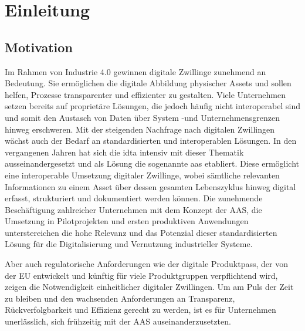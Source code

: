 \section{Einleitung}
\subsection{Motivation}
\label{sec:Motivation}
Im Rahmen von Industrie 4.0 gewinnen digitale Zwillinge zunehmend an Bedeutung. 
Sie ermöglichen die digitale Abbildung physischer Assets und sollen helfen, Prozesse transparenter und effizienter zu gestalten.
Viele Unternehmen setzen bereits auf proprietäre Lösungen, die jedoch häufig nicht interoperabel sind und somit den Austasch von Daten über System -und Unternehmensgrenzen hinweg erschweren.
Mit der steigenden Nachfrage nach digitalen Zwillingen wächst auch der Bedarf an standardisierten und interoperablen Lösungen.
In den vergangenen Jahren hat sich die \ac{idta} intensiv mit dieser Thematik ausseinandergesetzt und als Lösung die sogenannte \ac{aas} etabliert.
Diese ermöglicht eine interoperable Umsetzung digitaler Zwillinge, wobei sämtliche relevanten Informationen zu einem Asset über dessen gesamten Lebenszyklus hinweg digital erfasst, strukturiert und dokumentiert werden können. 
Die zunehmende Beschäftigung zahlreicher Unternehmen mit dem Konzept der AAS, die Umsetzung in Pilotprojekten und ersten produktiven Anwendungen unterstereichen die hohe Relevanz und das Potenzial dieser standardisierten Lösung für die Digitalisierung und Vernutzung industrieller Systeme.

Aber auch regulatorische Anforderungen wie der digitale Produktpass, der von der EU entwickelt und künftig für viele Produktgruppen verpflichtend wird, zeigen die Notwendigkeit einheitlicher digitaler Zwillingen. 
Um am Puls der Zeit zu bleiben und den wachsenden Anforderungen an Transparenz, Rückverfolgbarkeit und Effizienz gerecht zu werden, ist es für Unternehmen unerlässlich, sich frühzeitig mit der AAS auseinanderzusetzten.

